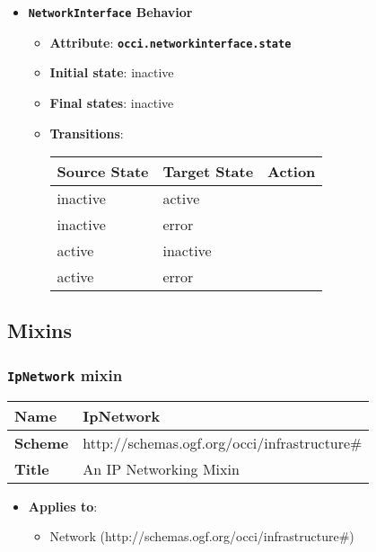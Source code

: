 \begin{itemize}
\item \textbf{\texttt{NetworkInterface} Behavior}
\begin{itemize}
\item \textbf{Attribute}: \textbf{\texttt{occi.networkinterface.state}}
\item \textbf{Initial state}: inactive
\item \textbf{Final states}:  	inactive
\item \textbf{Transitions}:

\begin{center}
\begin{tabular}{|l|l|l|}
  \hline
  \textbf{Source State} & \textbf{Target State} & \textbf{Action} \\
  \hline  
  inactive & active &   \\
  \hline
  inactive & error &   \\
  \hline
  active & inactive &   \\
  \hline
  active & error &   \\
  \hline
\end{tabular}
\end{center}
\end{itemize}
\end{itemize}

\subsection{Mixins}
\subsubsection{\texttt{IpNetwork} mixin}
\begin{center}
\begin{tabular}{|l|l|}
  \hline
  \textbf{Name} & IpNetwork \\
  \hline  
  \textbf{Scheme} & http://schemas.ogf.org/occi/infrastructure\# \\
  \hline
  \textbf{Title} & An IP Networking Mixin \\
  \hline
\end{tabular}
\end{center}
\begin{itemize}
\item \textbf{Applies to}:
\begin{itemize}
	\item Network (http://schemas.ogf.org/occi/infrastructure\#)
\end{itemize}
\end{itemize} 

